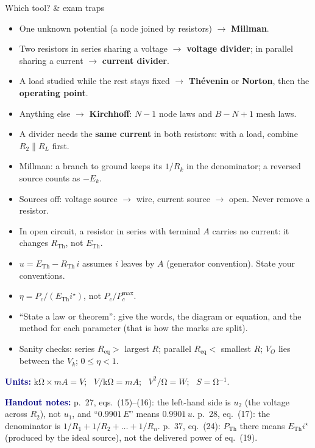 \documentclass[10pt,a4paper]{article}
\newlength{\colw}
\newenvironment{column}{\begin{minipage}[t]{\colw}\vspace{0pt}}{\end{minipage}}
\newcommand{\ETh}{E_{\mathrm{Th}}}
\newcommand{\RTh}{R_{\mathrm{Th}}}
\newcommand{\Req}{R_{\mathrm{eq}}}
\newcommand{\ist}{i^{\star}}
\newcommand{\hd}[1]{\textcolor{navy}{\textbf{#1}}}
\newcommand{\nxt}{\par\smallskip}
\begin{document}
\begin{column}
\begin{panel}{Which tool? \& exam traps}
\begin{itemize}
  \item One unknown potential (a node joined by resistors) $\to$ \textbf{Millman}.
  \item Two resistors in series sharing a voltage $\to$ \textbf{voltage divider}; in
    parallel sharing a current $\to$ \textbf{current divider}.
  \item A load studied while the rest stays fixed $\to$ \textbf{Thévenin} or
    \textbf{Norton}, then the \textbf{operating point}.
  \item Anything else $\to$ \textbf{Kirchhoff}: $N-1$ node laws and $B-N+1$ mesh laws.
\end{itemize}
\begin{trap}
\begin{itemize}
  \item A divider needs the \textbf{same current} in both resistors: with a load,
    combine $R_2 \parallel R_L$ first.
  \item Millman: a branch to ground keeps its $1/R_k$ in the denominator; a reversed
    source counts as $-E_k$.
  \item Sources off: voltage source $\to$ wire, current source $\to$ open. Never remove
    a resistor.
  \item In open circuit, a resistor in series with terminal $A$ carries no current: it
    changes $\RTh$, not $\ETh$.
  \item $u = \ETh - \RTh\, i$ assumes $i$ leaves by $A$ (generator convention). State
    your conventions.
  \item $\eta = P_c/(\ETh\ist)$, not $P_c/P_c^{\max}$.
  \item ``State a law or theorem'': give the words, the diagram or equation, and the
    method for each parameter (that is how the marks are split).
  \item Sanity checks: series $\Req >$ largest $R$; parallel $\Req <$ smallest $R$;
    $V_O$ lies between the $V_k$; $0 \le \eta < 1$.
\end{itemize}
\end{trap}
\hd{Units:} $\unit{\kilo\ohm} \times \unit{mA} = \unit{V}$; \
$\unit{V}/\unit{\kilo\ohm} = \unit{mA}$; \ $\unit{V^2}/\unit{\ohm} = \unit{W}$; \
$\unit{S} = \unit{\ohm^{-1}}$.
\nxt
\hd{Handout notes:} p.~27, eqs.~(15)--(16): the left-hand side is $u_2$ (the voltage
across $R_2$), not $u_1$, and ``$0.9901\,E$'' means $0.9901\,u$. p.~28, eq.~(17): the
denominator is $1/R_1 + 1/R_2 + \dots + 1/R_n$. p.~37, eq.~(24): $P_{\mathrm{Th}}$ there
means $\ETh\ist$ (produced by the ideal source), not the delivered power of eq.~(19).
\end{panel}
\end{column}
\end{document}
